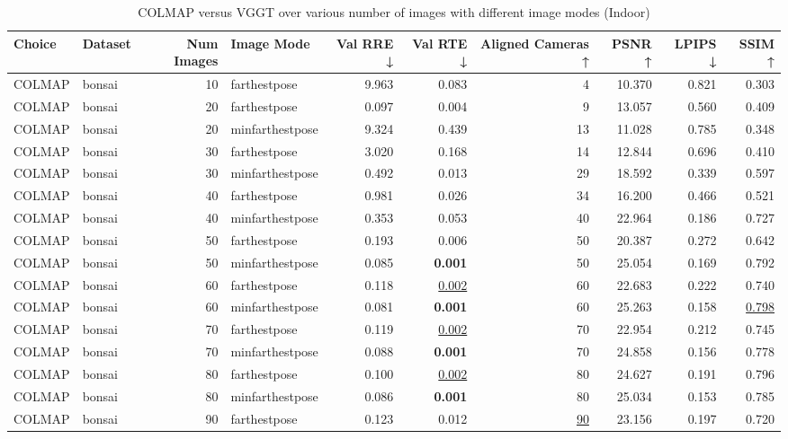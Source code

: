 \begin{table}[H]
\caption{\ifdefined\customcaption \customcaption \else COLMAP versus VGGT over various number of images with different image modes (Indoor) \fi}
\label{tab:01_num_images_image_mode_indoor}
\centering
\scriptsize
\begin{tabular}{llrlrrrrrr}
\toprule
Choice & Dataset & Num Images & Image Mode & Val RRE ↓ & Val RTE ↓ & Aligned Cameras ↑ & PSNR ↑ & LPIPS ↓ & SSIM ↑ \\
\midrule
COLMAP & bonsai & 10 & farthestpose & 9.963 & 0.083 & 4 & 10.370 & 0.821 & 0.303 \\
COLMAP & bonsai & 20 & farthestpose & 0.097 & 0.004 & 9 & 13.057 & 0.560 & 0.409 \\
COLMAP & bonsai & 20 & minfarthestpose & 9.324 & 0.439 & 13 & 11.028 & 0.785 & 0.348 \\
COLMAP & bonsai & 30 & farthestpose & 3.020 & 0.168 & 14 & 12.844 & 0.696 & 0.410 \\
COLMAP & bonsai & 30 & minfarthestpose & 0.492 & 0.013 & 29 & 18.592 & 0.339 & 0.597 \\
COLMAP & bonsai & 40 & farthestpose & 0.981 & 0.026 & 34 & 16.200 & 0.466 & 0.521 \\
COLMAP & bonsai & 40 & minfarthestpose & 0.353 & 0.053 & 40 & 22.964 & 0.186 & 0.727 \\
COLMAP & bonsai & 50 & farthestpose & 0.193 & 0.006 & 50 & 20.387 & 0.272 & 0.642 \\
COLMAP & bonsai & 50 & minfarthestpose & 0.085 & \textbf{0.001} & 50 & 25.054 & 0.169 & 0.792 \\
COLMAP & bonsai & 60 & farthestpose & 0.118 & \underline{0.002} & 60 & 22.683 & 0.222 & 0.740 \\
COLMAP & bonsai & 60 & minfarthestpose & 0.081 & \textbf{0.001} & 60 & 25.263 & 0.158 & \underline{0.798} \\
COLMAP & bonsai & 70 & farthestpose & 0.119 & \underline{0.002} & 70 & 22.954 & 0.212 & 0.745 \\
COLMAP & bonsai & 70 & minfarthestpose & 0.088 & \textbf{0.001} & 70 & 24.858 & 0.156 & 0.778 \\
COLMAP & bonsai & 80 & farthestpose & 0.100 & \underline{0.002} & 80 & 24.627 & 0.191 & 0.796 \\
COLMAP & bonsai & 80 & minfarthestpose & 0.086 & \textbf{0.001} & 80 & 25.034 & 0.153 & 0.785 \\
COLMAP & bonsai & 90 & farthestpose & 0.123 & 0.012 & \underline{90} & 23.156 & 0.197 & 0.720 \\

\end{tabular}
\end{table}
